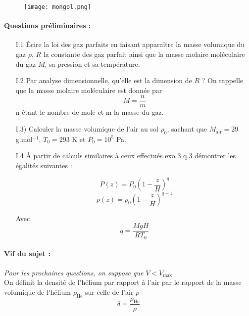 \documentclass[a4paper,12pt]{article}
\newcommand{\bepar}[1]{
	\left( #1 \right)  
}
\newcommand\bk{\color{black}}
\newcommand\brick{\color{brick}}
\begin{document}
\begin{figure}[!ht]
\centering
\texttt{[image: mongol.png]}
\end{figure}

\paragraph*{\brick Questions préliminaires : \bk}
\begin{itemize}[leftmargin=1cm]
	\item[I.1] Écire la loi des gaz parfaits en faisant apparaître la masse volumique du gaz $\rho$, $R$ la constante des gaz parfait ainsi que la masse molaire moléculaire du gaz $M$, sa pression et sa température.
	\item[I.2] Par analyse dimensionnelle, qu'elle est la dimension de $R$ ? On rappelle que la masse molaire moléculaire est donnée par $$ M = \frac{n}{m}$$ n étant le nombre de mole et m la masse du gaz.
	\item[I.3)] Calculer la masse volumique de l'air au sol $\rho_0$, sachant que $M_{\text{air}} = 29$ g.mol$^{-1}$, $T_0 = 293$ K et $P_0 = 10^5$ Pa.

	\item[I.4] À partir de calculs similaires à ceux effectués exo 3 q.3 démontrer les égalités suivantes :

	 $$ P(z) = P_0 \bepar{1 - \frac{z}{H}}^q$$ 
     $$\rho(z) = \rho_0 \bepar{1 - \frac{z}{H}}^{q-1}$$

Avec $$ q = \frac{MgH}{RT_0}$$
	
\end{itemize}	

\paragraph*{\brick Vif du sujet : \bk\\}
\textit{Pour les prochaines questions, on suppose que} $V<V_{\text{max}}$ \\[2mm]
On définit la densité de l'hélium  par rapport à l'air par le rapport de la masse volumique de l'hélium $\rho_{\text{He}}$ sur celle de l'air $\rho$ 
$$\delta = \frac{\rho_{\text{He}}}{\rho}$$ 
\end{document}
